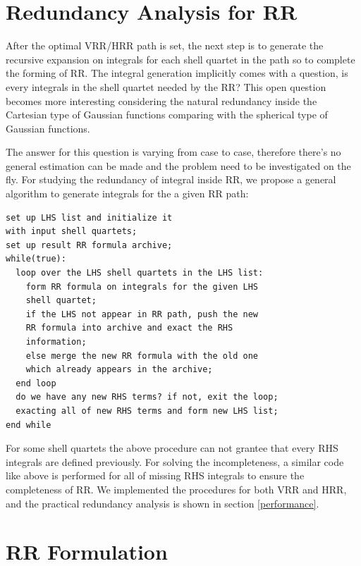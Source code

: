 \section{Redundancy Analysis for RR}

After the optimal VRR/HRR path is set, the next step is to generate the recursive expansion on 
integrals for each shell quartet in the path so to complete the forming of RR. The integral
generation implicitly comes with a question, is every integrals in the shell quartet needed
by the RR? This open question becomes more interesting considering the natural redundancy 
inside the Cartesian type of Gaussian functions comparing with the spherical type of Gaussian
functions.

The answer for this question is varying from case to case, therefore there's 
no general estimation can be made and the problem need to be investigated 
on the fly. For studying the redundancy of integral inside RR, we propose
a general algorithm to generate integrals for the a given RR path:
\begin{verbatim}
set up LHS list and initialize it
with input shell quartets;
set up result RR formula archive;
while(true):
  loop over the LHS shell quartets in the LHS list:
    form RR formula on integrals for the given LHS 
    shell quartet;
    if the LHS not appear in RR path, push the new 
    RR formula into archive and exact the RHS 
    information;
    else merge the new RR formula with the old one
    which already appears in the archive;
  end loop
  do we have any new RHS terms? if not, exit the loop;
  exacting all of new RHS terms and form new LHS list;
end while
\end{verbatim}
For some shell quartets the above procedure can not grantee that every
RHS integrals are defined previously. For solving the incompleteness,
a similar code like above is performed for all of missing RHS integrals
to ensure the completeness of RR. We implemented the procedures for 
both VRR and HRR, and the practical redundancy
analysis is shown in section \ref{performance}.
 
\section{RR Formulation}

